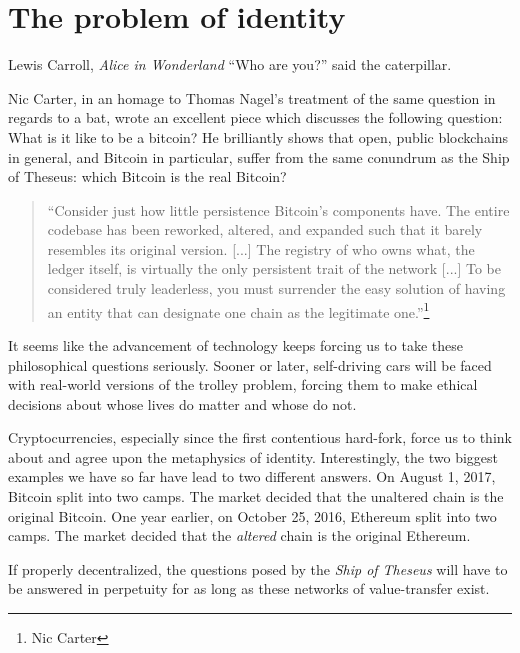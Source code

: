 \chapter{The problem of identity}
\label{les:4}

\begin{chapquote}{Lewis Carroll, \textit{Alice in Wonderland}}
  ``Who are you?'' said the caterpillar.
\end{chapquote}

Nic Carter, in an homage to Thomas Nagel's treatment of the same
question in regards to a bat, wrote an excellent piece which discusses
the following question: What is it like to be a bitcoin? He
brilliantly shows that open, public blockchains in general, and Bitcoin
in particular, suffer from the same conundrum as the Ship of
Theseus: which Bitcoin is the real Bitcoin?

\begin{quotation}
``Consider just how little persistence Bitcoin's components have. The
entire codebase has been reworked, altered, and expanded such that it
barely resembles its original version. [...] The registry of who
owns what, the ledger itself, is virtually the only persistent trait
of the network [...]
To be considered truly leaderless, you must surrender the easy
solution of having an entity that can designate one chain as the
legitimate one.''\footnote{Nic Carter}
\end{quotation}

It seems like the advancement of technology keeps forcing us to take
these philosophical questions seriously. Sooner or later, self-driving
cars will be faced with real-world versions of the trolley problem,
forcing them to make ethical decisions about whose lives do matter and
whose do not.

Cryptocurrencies, especially since the first contentious hard-fork,
force us to think about and agree upon the metaphysics of identity.
Interestingly, the two biggest examples we have so far have lead to two
different answers. On August 1, 2017, Bitcoin split into two camps. The
market decided that the unaltered chain is the original Bitcoin. One
year earlier, on October 25, 2016, Ethereum split into two camps. The
market decided that the \textit{altered} chain is the original Ethereum.

If properly decentralized, the questions posed by the \textit{Ship of Theseus}
will have to be answered in perpetuity for as long as these networks of
value-transfer exist.

